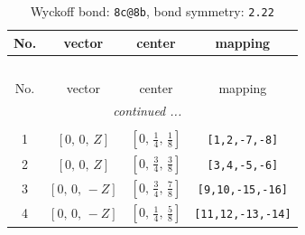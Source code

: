 \documentclass[fleqn,8pt]{jsarticle}
\begin{document}
\renewcommand{\arraystretch}{1.2}
\begin{longtable}{cccc}
\caption{Wyckoff bond: {\tt 8c@8b}, bond symmetry: {\tt 2.22}}
 \\
 \hline \hline
No. & vector & center & mapping \\ \hline \endfirsthead

\multicolumn{3}{l}{\tablename\ \thetable{}} \\
 \hline \hline
No. & vector & center & mapping \\ \hline \endhead

 \hline \hline
\multicolumn{3}{r}{\footnotesize\it continued ...} \\ \endfoot

 \hline \hline
\multicolumn{3}{r}{} \\ \endlastfoot

1 & $\left[ 0,\, 0,\, Z \right]$ & $\left[ 0,\, \frac{1}{4},\, \frac{1}{8} \right]$ & {\tt [1,2,-7,-8]} \\ \hline
2 & $\left[ 0,\, 0,\, Z \right]$ & $\left[ 0,\, \frac{3}{4},\, \frac{3}{8} \right]$ & {\tt [3,4,-5,-6]} \\ \hline
3 & $\left[ 0,\, 0,\, - Z \right]$ & $\left[ 0,\, \frac{3}{4},\, \frac{7}{8} \right]$ & {\tt [9,10,-15,-16]} \\ \hline
4 & $\left[ 0,\, 0,\, - Z \right]$ & $\left[ 0,\, \frac{1}{4},\, \frac{5}{8} \right]$ & {\tt [11,12,-13,-14]} \\
\end{longtable}
\renewcommand{\arraystretch}{1.2}
\end{document}
